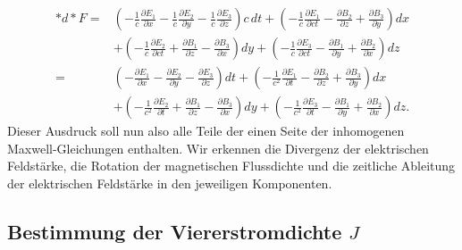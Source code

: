 \begin{align*}
	\ast d \ast F = 
	&\left( -\frac{1}{c}\frac{\partial E_1}{\partial x} -\frac{1}{c}\frac{\partial E_2}{\partial y} - \frac{1}{c}\frac{\partial E_3}{\partial z} \right) c\,dt +
	\left(-\frac{1}{c}\frac{\partial E_1}{\partial ct} - \frac{\partial B_2}{\partial z} + \frac{\partial B_3}{\partial y} \right) dx\\
	& + \left( -\frac{1}{c}\frac{\partial E_2}{\partial ct} + \frac{\partial B_1}{\partial z} - \frac{\partial B_3}{\partial x} \right) dy +
	\left( -\frac{1}{c}\frac{\partial E_3}{\partial ct} - \frac{\partial B_1}{\partial y} + \frac{\partial B_2}{\partial x} \right) dz\\[2ex]
	=&\left( -\frac{\partial E_1}{\partial x} -\frac{\partial E_2}{\partial y} - \frac{\partial E_3}{\partial z} \right) dt +
	\left(-\frac{1}{c^2}\frac{\partial E_1}{\partial t} - \frac{\partial B_2}{\partial z} + \frac{\partial B_3}{\partial y} \right) dx\\
	& + \left( -\frac{1}{c^2}\frac{\partial E_2}{\partial t} + \frac{\partial B_1}{\partial z} - \frac{\partial B_3}{\partial x} \right) dy +
	\left( -\frac{1}{c^2}\frac{\partial E_3}{\partial t} - \frac{\partial B_1}{\partial y} + \frac{\partial B_2}{\partial x} \right) dz.
\end{align*}
Dieser Ausdruck soll nun also alle Teile der einen Seite der inhomogenen Maxwell-Gleichungen enthalten.
Wir erkennen die Divergenz der elektrischen Feldstärke, die Rotation der magnetischen Flussdichte und die zeitliche Ableitung der elektrischen Feldstärke in den jeweiligen Komponenten.
\subsection{Bestimmung der Viererstromdichte $J$}

